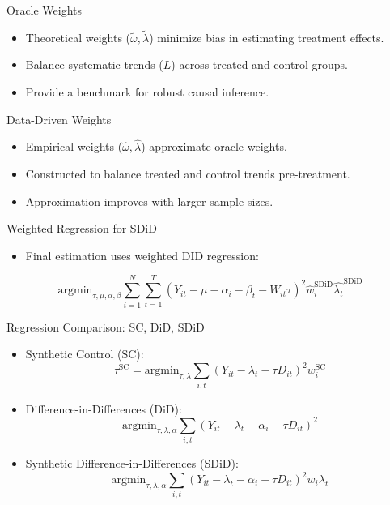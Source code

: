 \documentclass{beamer}
\begin{document}
\begin{frame}{Oracle Weights}
\begin{itemize}
\item Theoretical weights (\(\tilde{\omega}, \tilde{\lambda}\)) minimize bias in estimating treatment effects.
\item Balance systematic trends (\(L\)) across treated and control groups.
\item Provide a benchmark for robust causal inference.
\end{itemize}
\end{frame}

\begin{frame}{Data-Driven Weights}
\begin{itemize}
\item Empirical weights (\(\hat{\omega}, \hat{\lambda}\)) approximate oracle weights.
\item Constructed to balance treated and control trends pre-treatment.
\item Approximation improves with larger sample sizes.
\end{itemize}
\end{frame}

\begin{frame}{Weighted Regression for SDiD}

\begin{itemize}
    \item Final estimation uses weighted DID regression:
\end{itemize}

\[
\textrm{argmin}_{\tau, \mu, \alpha, \beta} \sum_{i=1}^N \sum_{t=1}^T \left( Y_{it} - \mu - \alpha_i - \beta_t - W_{it}\tau \right)^2 \widehat{w}_i^{\text{SDiD}} \widehat{\lambda_t}^{\text{SDiD}}
\]

\end{frame}




\begin{frame}{Regression Comparison: SC, DiD, SDiD}

\begin{itemize}
    \item Synthetic Control (SC):
    \[
    \tau^{\text{SC}} = \textrm{argmin}_{\tau, \lambda} \sum_{i,t} (Y_{it} - \lambda_t - \tau D_{it})^2 w_i^{\text{SC}}
    \]
    \item Difference-in-Differences (DiD):
    \[
    \textrm{argmin}_{\tau, \lambda, \alpha} \sum_{i,t} (Y_{it} - \lambda_t - \alpha_i - \tau D_{it})^2
    \]
    \item Synthetic Difference-in-Differences (SDiD):
    \[
    \textrm{argmin}_{\tau, \lambda, \alpha} \sum_{i,t} (Y_{it} - \lambda_t - \alpha_i - \tau D_{it})^2 w_i \lambda_t
    \]
\end{itemize}

\end{frame}
\end{document}
